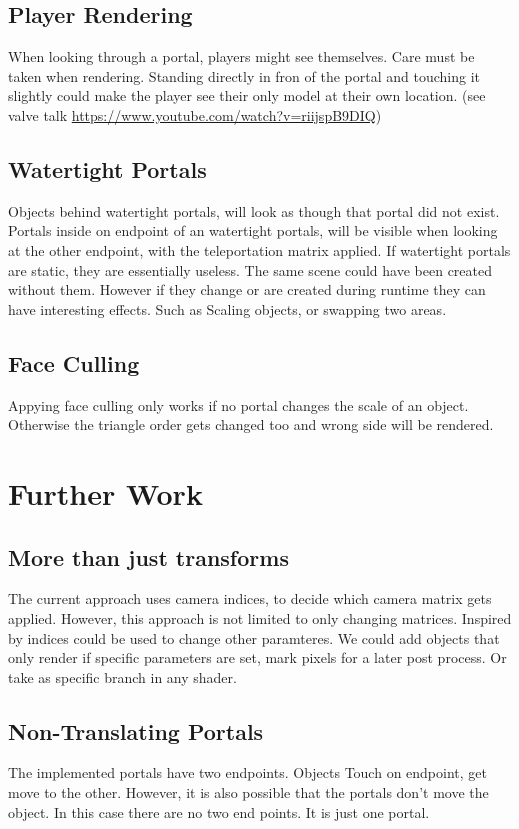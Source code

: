 \subsection{Player Rendering}
When looking through a portal, players might see themselves. Care must be taken when rendering. Standing directly in fron of the portal and touching it slightly could make the player see their only model at their own location. (see valve talk \url{https://www.youtube.com/watch?v=riijspB9DIQ})

\subsection{Watertight Portals}
Objects behind watertight portals, will look as though that portal did not exist. Portals inside on endpoint of an watertight portals, will be visible when looking at the other endpoint, with the teleportation matrix applied. If watertight portals are static, they are essentially useless. The same scene could have been created without them.
However if they change or are created during runtime they can have interesting effects. Such as Scaling objects, or swapping two areas.

\subsection{Face Culling}
Appying face culling only works if no portal changes the scale of an object. Otherwise the triangle order gets changed too and wrong side will be rendered.


\section{Further Work}
\subsection{More than just transforms}
\label{more than transforms}
The current approach uses camera indices, to decide which camera matrix gets applied. However, this approach is not limited to only changing matrices. Inspired by \cite{borst:2009:real} indices could be used to change other paramteres. We could add objects that only render if specific parameters are set, mark pixels for a later post process. Or take as specific branch in any shader.

\subsection{Non-Translating Portals}
The implemented portals have two endpoints. Objects Touch on endpoint, get move to the other. However, it is also possible that the portals don't move the object. In this case there are no two end points. It is just one portal.

